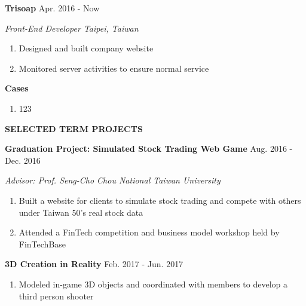 \documentclass[12pt]{article}
\begin{document}
	\vspace{0.5em}

	\textbf{Trisoap} \hfill{Apr. 2016 - Now}

	\textit{Front-End Developer \hfill{Taipei, Taiwan}}

	\begin{enumerate}

		\item Designed and built company website

		\item Monitored server activities to ensure normal service

	\end{enumerate}

	\vspace{0.5em}

	\textbf{Cases}

	\begin{enumerate}

		\item 123

	\end{enumerate}

	\vspace{1em}

\textbf{\large{\uppercase{Selected Term Projects}}}
\hrulefill{}

	\textbf{Graduation Project: Simulated Stock Trading Web Game} \hfill{Aug. 2016 - Dec. 2016}

	\textit{Advisor: Prof. Seng-Cho Chou \hfill{National Taiwan University}}

	\begin{enumerate}

		\item Built a website for clients to simulate stock trading and compete with others under Taiwan 50's real stock data

		\item Attended a FinTech competition and business model workshop held by FinTechBase

	\end{enumerate}

	\vspace{0.5em}

	\textbf{3D Creation in Reality} \hfill{Feb. 2017 - Jun. 2017}

	\begin{enumerate}

		\item Modeled in-game 3D objects and coordinated with members to develop a third person shooter

	\end{enumerate}
\end{document}
